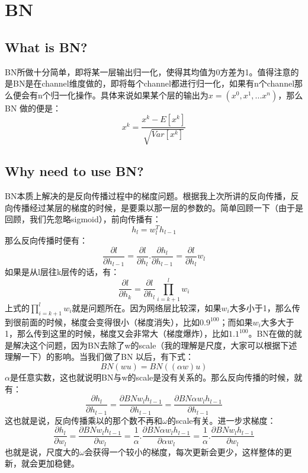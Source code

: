\documentclass{article}
\begin{document}
\section{BN}
\subsection{What is BN?}
BN所做十分简单，即将某一层输出归一化，使得其均值为0方差为1。值得注意的是BN是在channel维度做的，即将每个channel都进行归一化，如果有n个channel那么便会有n个归一化操作。具体来说如果某个层的输出为$x=(x^{0},x^{1},...x^{n})$，那么BN 做的便是：
$$
x^{k}=\frac{x^{k}-E[x^{k}]}{\sqrt{Var[x^{k}]}}
$$

\subsection{Why need to use BN?}
BN本质上解决的是反向传播过程中的梯度问题。根据我上次所讲的反向传播，反向传播经过某层的梯度的时候，是要乘以那一层的参数的。简单回顾一下（由于是回顾，我们先忽略sigmoid），前向传播有：
$$h_l = w_l^Th_{l-1}$$
那么反向传播时便有：
$$\frac{\partial l}{\partial h_{l-1}} = \frac{\partial l}{\partial h_l} . \frac{\partial h_l}{\partial h_{l-1}} = \frac{\partial l}{\partial h_l} w_l$$
如果是从l层往k层传的话，有：
$$\frac{\partial l}{\partial h_k} = \frac{\partial l}{\partial h_l} \prod_{i=k+1}^{l} w_i
$$
上式的$\prod_{i=k+1}^l w_i$就是问题所在。因为网络层比较深，如果$w_{i}$大多小于1，那么传到很前面的时候，梯度会变得很小（梯度消失），比如$0.9^{100}$；而如果$w_{i}$大多大于1，那么传到这里的时候，梯度又会非常大（梯度爆炸），比如$1.1^{100}$。BN在做的就是解决这个问题，因为BN去除了w的scale（我的理解是尺度，大家可以根据下述理解一下）的影响。当我们做了BN 以后，有下式：
$$BN(wu)=BN((\alpha w)u)$$
$\alpha$是任意实数，这也就说明BN与w的scale是没有关系的。那么反向传播的时候，就有：
$$
\frac{\partial h_l}{\partial h_{l-1}}=\frac{\partial BN w_lh_{l-1}}{\partial h_{l-1}} =\frac{\partial BN \alpha w_lh_{l-1}}{\partial h_{l-1}}
$$
这也就是说，反向传播乘以的那个数不再和$\omega$的scale有关。进一步求梯度：
$$
\frac{\partial h_l}{\partial w_l} = \frac{\partial BNw_lh_{l-1}}{\partial w_l} = \frac{1}{\alpha}.\frac{\partial BN \alpha w_l h_{l-1}}{\partial \alpha w_l} =  \frac{1}{\alpha}.\frac{\partial BN w_l h_{l-1}}{\partial w_l}
$$
也就是说，尺度大的$\omega$会获得一个较小的梯度，每次更新会更少，这样整体的更新，就会更加稳健。
\end{document}
